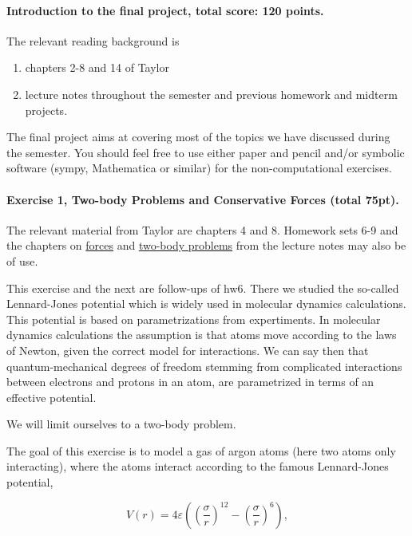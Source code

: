 \documentclass[%
oneside,                 %
final,                   %
10pt]{article}
\begin{document}
\noindent
\paragraph{Introduction to the final project, total score: 120  points.}
The relevant reading background is
\begin{enumerate}
\item chapters 2-8 and 14 of Taylor

\item lecture notes throughout the semester and previous homework and midterm projects.
\end{enumerate}

\noindent
The final project aims at covering most of the topics we have
discussed during the semester. You should feel free to use either
paper and pencil and/or symbolic software (sympy, Mathematica or
similar) for the non-computational exercises.


\paragraph{Exercise 1, Two-body Problems and Conservative Forces (total 75pt).}
The relevant material from Taylor are chapters 4 and 8. Homework sets 6-9 and the chapters on \href{{https://mhjensen.github.io/Physics321/doc/LectureNotes/_build/html/chapter4.html}}{forces} and \href{{https://mhjensen.github.io/Physics321/doc/LectureNotes/_build/html/chapter6.html}}{two-body problems} from the lecture notes may also be of use. 

This exercise and the next are  follow-ups of hw6. There we studied the so-called
Lennard-Jones potential which is widely used in molecular dynamics
calculations. This potential is based on parametrizations from
expertiments. In molecular dynamics calculations the assumption is
that atoms move according to the laws of Newton, given the correct
model for interactions. We can say then that quantum-mechanical
degrees of freedom stemming from complicated interactions between electrons
and protons in an atom, are parametrized in terms of an effective
potential.

We will limit ourselves to a two-body problem.

The goal of this exercise is to model a gas of argon atoms (here two
atoms only interacting), where the atoms interact according to the
famous Lennard-Jones potential,

\begin{equation}
    V(r) = 4\varepsilon\left((\frac{\sigma}{r})^{12} - (\frac{\sigma}{r})^6\right), \label{eq:lj}
\end{equation}
\end{document}
